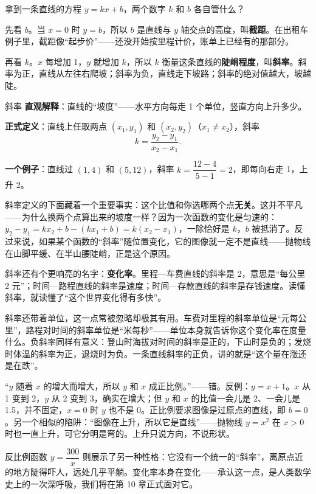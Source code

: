 拿到一条直线的方程 $y = kx + b$，两个数字 $k$ 和 $b$ 各自管什么？

先看 $b$。当 $x = 0$ 时 $y = b$，所以 $b$ 是直线与 $y$ 轴交点的高度，叫\textbf{截距}。在出租车例子里，截距像“起步价”——还没开始按里程计价，账单上已经有的那部分。

再看 $k$。$x$ 每增加 1，$y$ 就增加 $k$，所以 $k$ 衡量这条直线的\textbf{陡峭程度}，叫\textbf{斜率}。斜率为正，直线从左往右爬坡；斜率为负，直线走下坡路；斜率的绝对值越大，坡越陡。

\begin{shuyu}{斜率}
\textbf{直观解释}：直线的“坡度”——水平方向每走 1 个单位，竖直方向上升多少。

\textbf{正式定义}：直线上任取两点 $(x_1, y_1)$ 和 $(x_2, y_2)$（$x_1 \neq x_2$），斜率
\[
k = \frac{y_2 - y_1}{x_2 - x_1}.
\]

\textbf{一个例子}：直线过 $(1, 4)$ 和 $(5, 12)$，斜率 $k = \dfrac{12 - 4}{5 - 1} = 2$，即每向右走 1，上升 2。
\end{shuyu}

斜率定义的下面藏着一个重要事实：这个比值和你选哪两个点\textbf{无关}。这并不平凡——为什么换两个点算出来的坡度一样？因为一次函数的变化是匀速的：$y_2 - y_1 = kx_2 + b - (kx_1 + b) = k(x_2 - x_1)$，一除恰好是 $k$，$b$ 被抵消了。反过来说，如果某个函数的“斜率”随位置变化，它的图像就一定不是直线——抛物线在山脚平缓、在半山腰陡峭，正是这个原因。

斜率还有个更响亮的名字：\textbf{变化率}。里程—车费直线的斜率是 2，意思是“每公里 2 元”；时间—路程直线的斜率是速度；时间—存款直线的斜率是存钱速度。读懂斜率，就读懂了“这个世界变化得有多快”。

斜率还带着单位，这一点常被忽略却极其有用。车费对里程的斜率单位是“元每公里”，路程对时间的斜率单位是“米每秒”——单位本身就告诉你这个变化率在度量什么。负斜率同样有意义：登山时海拔对时间的斜率是正的，下山时是负的；发烧时体温的斜率为正，退烧时为负。一条直线斜率的正负，讲的就是“这个量在涨还是在跌”。

\begin{fanli}
“$y$ 随着 $x$ 的增大而增大，所以 $y$ 和 $x$ 成正比例。”——错。反例：$y = x + 1$。$x$ 从 1 变到 2，$y$ 从 2 变到 3，确实在增大；但 $y$ 和 $x$ 的比值一会儿是 2、一会儿是 1.5，并不固定，$x = 0$ 时 $y$ 也不是 0。正比例要求图像是过原点的直线，即 $b = 0$。另一个相似的陷阱：“图像在上升，所以它是直线”——抛物线 $y = x^2$ 在 $x > 0$ 时也一直上升，可它分明是弯的。上升只说方向，不说形状。
\end{fanli}

反比例函数 $y = \dfrac{300}{x}$ 则展示了另一种性格：它没有一个统一的“斜率”，离原点近的地方陡得吓人，远处几乎平躺。变化率本身在变化——承认这一点，是人类数学史上的一次深呼吸，我们将在第 10 章正式面对它。


